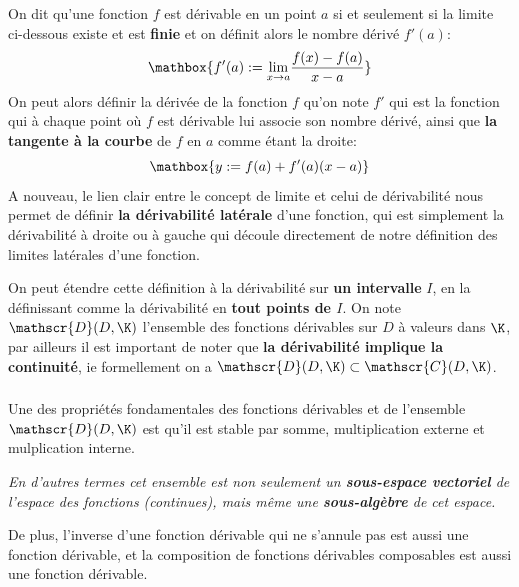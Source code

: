 \chapter*{} %

\subsection*{}

On dit qu'une fonction \(f\) est dérivable en un point \(a\) si et seulement si la limite ci-dessous existe et est \textbf{finie} et on définit alors le nombre dérivé \(f'(a)\):
\[
   \mathbox{f'(a) := \underset{x \rightarrow a}{\lim} \frac{f(x) - f(a)}{x - a}}   
\]
On peut alors définir la dérivée de la fonction \(f\) qu'on note \(f'\)  qui est la fonction qui à chaque point où \(f\) est dérivable lui associe son nombre dérivé, ainsi que \textbf{la tangente à la courbe} de \(f\) en \(a\) comme étant la droite:
\[
   \mathbox{y := f(a) + f'(a)(x - a)}   
\]
A nouveau, le lien clair entre le concept de limite et celui de dérivabilité nous permet de définir \textbf{la dérivabilité latérale} d'une fonction, qui est simplement la dérivabilité à droite ou à gauche qui découle directement de notre définition des limites latérales d'une fonction.\<

On peut étendre cette définition à la dérivabilité sur \textbf{un intervalle} \(I\), en la définissant comme la dérivabilité en \textbf{tout points de \(I\)}.\+
On note \(\mathscr{D}(D, \K)\) l'ensemble des fonctions dérivables sur \(D\) à valeurs dans \(\K\), par ailleurs il est important de noter que \textbf{la dérivabilité implique la continuité}, ie formellement on a \(\mathscr{D}(D, \K) \subset \mathscr{C}(D, \K)\).

\subsection*{}

Une des propriétés fondamentales des fonctions dérivables et de l'ensemble \(\mathscr{D}(D, \K)\) est qu'il est stable par somme, multiplication externe et mulplication interne.
\begin{center}
   \textit{
      En d'autres termes cet ensemble est non seulement un \textbf{sous-espace vectoriel} de l'espace des fonctions (continues), mais même une \textbf{sous-algèbre} de cet espace.
   }
\end{center}
De plus, l'inverse d'une fonction dérivable qui ne s'annule pas est aussi une fonction dérivable, et la composition de fonctions dérivables composables est aussi une fonction dérivable.

